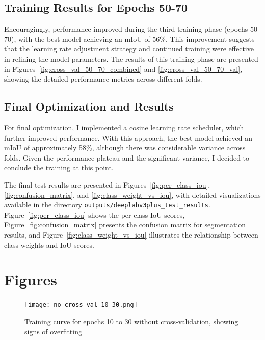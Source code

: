\documentclass[]{article}
\begin{document}
\subsection{Training Results for Epochs 50-70}
Encouragingly, performance improved during the third training phase (epochs 50-70), with the best model achieving an mIoU of 56\%. This improvement suggests that the learning rate adjustment strategy and continued training were effective in refining the model parameters. The results of this training phase are presented in Figures~\ref{fig:cross_val_50_70_combined} and \ref{fig:cross_val_50_70_val}, showing the detailed performance metrics across different folds.



\subsection{Final Optimization and Results}
For final optimization, I implemented a cosine learning rate scheduler, which further improved performance. With this approach, the best model achieved an mIoU of approximately 58\%, although there was considerable variance across folds. Given the performance plateau and the significant variance, I decided to conclude the training at this point.

The final test results are presented in Figures~\ref{fig:per_class_iou}, \ref{fig:confusion_matrix}, and \ref{fig:class_weight_vs_iou}, with detailed visualizations available in the directory \texttt{outputs/deeplabv3plus\_test\_results}. Figure~\ref{fig:per_class_iou} shows the per-class IoU scores, Figure~\ref{fig:confusion_matrix} presents the confusion matrix for segmentation results, and Figure~\ref{fig:class_weight_vs_iou} illustrates the relationship between class weights and IoU scores.

\section{Figures}

\begin{figure}[htbp]
		\centering
		\texttt{[image: no\_cross\_val\_10\_30.png]}
		\caption{Training curve for epochs 10 to 30 without cross-validation, showing signs of overfitting}
		\label{fig:no_cross_val_10_30}
\end{figure}
\end{document}
